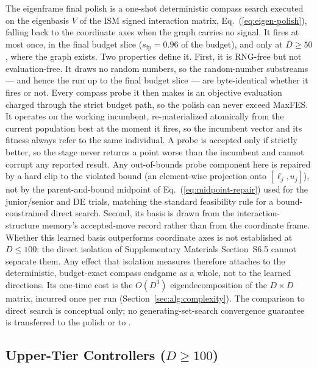 The eigenframe final polish is a one-shot deterministic compass search
executed on the eigenbasis $V$ of the ISM signed interaction matrix,
Eq.~(\ref{eq:eigen-polish}), falling back to the coordinate axes when
the graph carries no signal.
It fires at most once, in the final budget slice
($s_{\text{fp}}=0.96$ of the budget), and only at $D\ge50$,
where the graph exists. %
Two properties define it.
First, it is RNG-free but not evaluation-free. It draws no random
numbers, so the random-number substreams --- and hence the run up to
the final budget slice --- are byte-identical whether it fires or not.
Every compass probe it then makes is an objective evaluation charged
through the strict budget path, so the polish can never exceed
MaxFES. %
It operates on the working incumbent, re-materialized atomically from the current
population best at the moment it fires, so the incumbent vector and its fitness
always refer to the same individual. A probe is accepted only if strictly
better, so the stage never returns a
point worse than the incumbent and cannot corrupt any reported result. Any out-of-bounds probe component here is repaired by a hard clip to the violated bound (an element-wise projection onto $[\ell_j,u_j]$), not by the parent-and-bound midpoint of Eq.~(\ref{eq:midpoint-repair}) used for the junior/senior and DE trials, matching the standard feasibility rule for a bound-constrained direct search.
Second, its basis is drawn from the interaction-structure memory's accepted-move
record rather than from the coordinate frame. Whether this learned basis
outperforms coordinate axes is not established at $D\le100$: the direct
isolation of Supplementary Materials Section~S6.5 cannot separate them.
Any effect that isolation measures therefore attaches to the deterministic,
budget-exact compass endgame as a whole, not to the learned directions.
Its one-time cost is the $O(D^{3})$ eigendecomposition of the
$D\times D$ matrix, incurred once per run
(Section~\ref{sec:alg:complexity}). %
The comparison to direct search is conceptual only; no
generating-set-search convergence guarantee is transferred to the
polish or to \dtgsk{}.

\subsection{Upper-Tier Controllers ($D\ge100$)}\label{sec:alg:highd}

